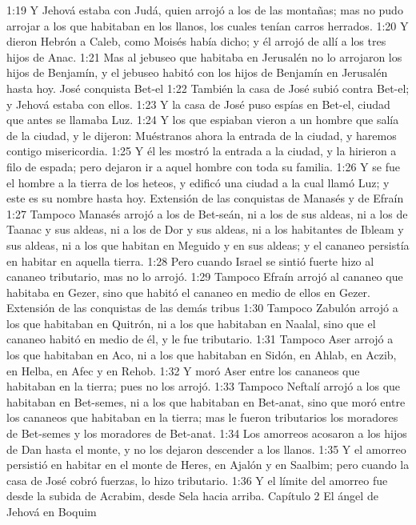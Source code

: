 1:19 Y Jehová estaba con Judá, quien arrojó a los de las montañas; mas no pudo arrojar a los que habitaban en los llanos, los cuales tenían carros herrados.  
1:20 Y dieron Hebrón a Caleb, como Moisés había dicho; y él arrojó de allí a los tres hijos de Anac. 
1:21 Mas al jebuseo que habitaba en Jerusalén no lo arrojaron los hijos de Benjamín, y el jebuseo habitó con los hijos de Benjamín en Jerusalén hasta hoy. 
José conquista Bet-el  
1:22 También la casa de José subió contra Bet-el; y Jehová estaba con ellos.  
1:23 Y la casa de José puso espías en Bet-el, ciudad que antes se llamaba Luz.  
1:24 Y los que espiaban vieron a un hombre que salía de la ciudad, y le dijeron: Muéstranos ahora la entrada de la ciudad, y haremos contigo misericordia.  
1:25 Y él les mostró la entrada a la ciudad, y la hirieron a filo de espada; pero dejaron ir a aquel hombre con toda su familia.  
1:26 Y se fue el hombre a la tierra de los heteos, y edificó una ciudad a la cual llamó Luz; y este es su nombre hasta hoy.  
Extensión de las conquistas de Manasés y de Efraín  
1:27 Tampoco Manasés arrojó a los de Bet-seán, ni a los de sus aldeas, ni a los de Taanac y sus aldeas, ni a los de Dor y sus aldeas, ni a los habitantes de Ibleam y sus aldeas, ni a los que habitan en Meguido y en sus aldeas; y el cananeo persistía en habitar en aquella tierra.  
1:28 Pero cuando Israel se sintió fuerte hizo al cananeo tributario, mas no lo arrojó. 
1:29 Tampoco Efraín arrojó al cananeo que habitaba en Gezer, sino que habitó el cananeo en medio de ellos en Gezer. 
Extensión de las conquistas de las demás tribus  
1:30 Tampoco Zabulón arrojó a los que habitaban en Quitrón, ni a los que habitaban en Naalal, sino que el cananeo habitó en medio de él, y le fue tributario.  
1:31 Tampoco Aser arrojó a los que habitaban en Aco, ni a los que habitaban en Sidón, en Ahlab, en Aczib, en Helba, en Afec y en Rehob.  
1:32 Y moró Aser entre los cananeos que habitaban en la tierra; pues no los arrojó.  
1:33 Tampoco Neftalí arrojó a los que habitaban en Bet-semes, ni a los que habitaban en Bet-anat, sino que moró entre los cananeos que habitaban en la tierra; mas le fueron tributarios los moradores de Bet-semes y los moradores de Bet-anat. 
1:34 Los amorreos acosaron a los hijos de Dan hasta el monte, y no los dejaron descender a los llanos.  
1:35 Y el amorreo persistió en habitar en el monte de Heres, en Ajalón y en Saalbim; pero cuando la casa de José cobró fuerzas, lo hizo tributario.  
1:36 Y el límite del amorreo fue desde la subida de Acrabim, desde Sela hacia arriba.  
Capítulo 2
El ángel de Jehová en Boquim  

